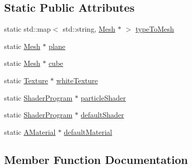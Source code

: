 \subsection*{Static Public Attributes}
\begin{DoxyCompactItemize}
\item 
static std\+::map$<$ std\+::string, \mbox{\hyperlink{class_beer_engine_1_1_graphics_1_1_mesh}{Mesh}} $\ast$ $>$ \mbox{\hyperlink{class_beer_engine_1_1_graphics_1_1_graphics_aa85582550135ddfbdf9a9f01bf037db8}{type\+To\+Mesh}}
\item 
static \mbox{\hyperlink{class_beer_engine_1_1_graphics_1_1_mesh}{Mesh}} $\ast$ \mbox{\hyperlink{class_beer_engine_1_1_graphics_1_1_graphics_a016282a834c725e53a78ad677a4b0e92}{plane}}
\item 
static \mbox{\hyperlink{class_beer_engine_1_1_graphics_1_1_mesh}{Mesh}} $\ast$ \mbox{\hyperlink{class_beer_engine_1_1_graphics_1_1_graphics_a291e41114824803286b61444d51dbbed}{cube}}
\item 
static \mbox{\hyperlink{class_beer_engine_1_1_graphics_1_1_texture}{Texture}} $\ast$ \mbox{\hyperlink{class_beer_engine_1_1_graphics_1_1_graphics_adf77b414d3bba48dfc5c6d73bc2c8379}{white\+Texture}}
\item 
static \mbox{\hyperlink{class_beer_engine_1_1_graphics_1_1_shader_program}{Shader\+Program}} $\ast$ \mbox{\hyperlink{class_beer_engine_1_1_graphics_1_1_graphics_acf24282d07f1550565efe2e70267d0b9}{particle\+Shader}}
\item 
static \mbox{\hyperlink{class_beer_engine_1_1_graphics_1_1_shader_program}{Shader\+Program}} $\ast$ \mbox{\hyperlink{class_beer_engine_1_1_graphics_1_1_graphics_a2d9a8586cdd37aa90b847648c98bc2bb}{default\+Shader}}
\item 
static \mbox{\hyperlink{class_beer_engine_1_1_graphics_1_1_a_material}{A\+Material}} $\ast$ \mbox{\hyperlink{class_beer_engine_1_1_graphics_1_1_graphics_add3cee4b8390ccdf3df6810ac5fbe5a2}{default\+Material}}
\end{DoxyCompactItemize}


\subsection{Member Function Documentation}
\mbox{\label{class_beer_engine_1_1_graphics_1_1_graphics_a87ad2f3a98b4fa5fd453589f7f023701}} 
